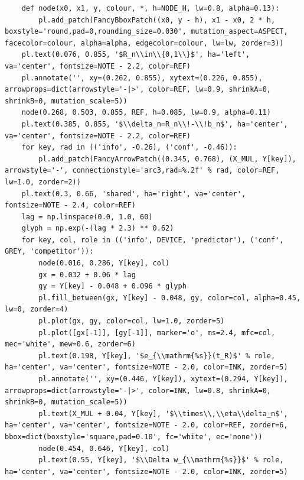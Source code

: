 \documentclass[a4paper,10pt]{article}
\begin{document}
\begin{Verbatim}
    def node(x0, x1, y, colour, *, h=NODE_H, lw=0.8, alpha=0.13):
        pl.add_patch(FancyBboxPatch((x0, y - h), x1 - x0, 2 * h, boxstyle='round,pad=0,rounding_size=0.030', mutation_aspect=ASPECT, facecolor=colour, alpha=alpha, edgecolor=colour, lw=lw, zorder=3))
    pl.text(0.076, 0.855, '$R_n\\in\\{0,1\\}$', ha='left', va='center', fontsize=NOTE - 2.2, color=REF)
    pl.annotate('', xy=(0.262, 0.855), xytext=(0.226, 0.855), arrowprops=dict(arrowstyle='-|>', color=REF, lw=0.9, shrinkA=0, shrinkB=0, mutation_scale=5))
    node(0.268, 0.503, 0.855, REF, h=0.085, lw=0.9, alpha=0.11)
    pl.text(0.385, 0.855, '$\\delta_n=R_n\\!-\\!b_n$', ha='center', va='center', fontsize=NOTE - 2.2, color=REF)
    for key, rad in (('info', -0.26), ('conf', -0.46)):
        pl.add_patch(FancyArrowPatch((0.345, 0.768), (X_MUL, Y[key]), arrowstyle='-', connectionstyle='arc3,rad=%.2f' % rad, color=REF, lw=1.0, zorder=2))
    pl.text(0.3, 0.66, 'shared', ha='right', va='center', fontsize=NOTE - 2.4, color=REF)
    lag = np.linspace(0.0, 1.0, 60)
    glyph = np.exp(-(lag * 2.3) ** 0.62)
    for key, col, role in (('info', DEVICE, 'predictor'), ('conf', GREY, 'competitor')):
        node(0.016, 0.286, Y[key], col)
        gx = 0.032 + 0.06 * lag
        gy = Y[key] - 0.048 + 0.096 * glyph
        pl.fill_between(gx, Y[key] - 0.048, gy, color=col, alpha=0.45, lw=0, zorder=4)
        pl.plot(gx, gy, color=col, lw=1.0, zorder=5)
        pl.plot([gx[-1]], [gy[-1]], marker='o', ms=2.4, mfc=col, mec='white', mew=0.6, zorder=6)
        pl.text(0.198, Y[key], '$e_{\\mathrm{%s}}(t_R)$' % role, ha='center', va='center', fontsize=NOTE - 2.0, color=INK, zorder=5)
        pl.annotate('', xy=(0.446, Y[key]), xytext=(0.294, Y[key]), arrowprops=dict(arrowstyle='-|>', color=INK, lw=0.8, shrinkA=0, shrinkB=0, mutation_scale=5))
        pl.text(X_MUL + 0.04, Y[key], '$\\times\\,\\eta\\delta_n$', ha='center', va='center', fontsize=NOTE - 2.0, color=REF, zorder=6, bbox=dict(boxstyle='square,pad=0.10', fc='white', ec='none'))
        node(0.454, 0.646, Y[key], col)
        pl.text(0.55, Y[key], '$\\Delta w_{\\mathrm{%s}}$' % role, ha='center', va='center', fontsize=NOTE - 2.0, color=INK, zorder=5)

\end{Verbatim}
\end{document}
